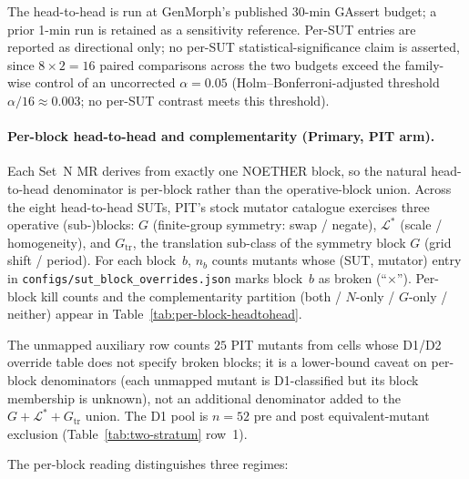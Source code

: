 \documentclass[manuscript]{acmart}
\begin{document}
The head-to-head is run at GenMorph's published 30-min GAssert budget;
a prior 1-min run is retained as a sensitivity reference. Per-SUT
entries are reported as directional only; no per-SUT
statistical-significance claim is asserted, since $8\times 2 = 16$
paired comparisons across the two budgets exceed the family-wise
control of an uncorrected $\alpha = 0.05$ (Holm--Bonferroni-adjusted
threshold $\alpha/16 \approx 0.003$; no per-SUT contrast meets this
threshold).

\paragraph{Per-block head-to-head and complementarity (Primary, PIT arm).}
Each Set~N MR derives from exactly one NOETHER block, so the natural head-to-head denominator is per-block rather than the operative-block union. Across the eight head-to-head SUTs, PIT's stock mutator catalogue exercises three operative (sub-)blocks: $G$ (finite-group symmetry: swap / negate), $\mathcal{L}^{*}$ (scale / homogeneity), and $G_{\mathrm{tr}}$, the translation sub-class of the symmetry block $G$ (grid shift / period). For each block~$b$, $n_{b}$ counts mutants whose (SUT, mutator) entry in \texttt{configs/sut\_block\_overrides.json} marks block~$b$ as broken (``$\times$''). Per-block kill counts and the complementarity partition (both / $N$-only / $G$-only / neither) appear in Table~\ref{tab:per-block-headtohead}.

The unmapped auxiliary row counts $25$ PIT mutants from cells whose D1/D2 override table does not specify broken blocks; it is a lower-bound caveat on per-block denominators (each unmapped mutant is D1-classified but its block membership is unknown), not an additional denominator added to the $G + \mathcal{L}^{*} + G_{\mathrm{tr}}$ union. The D1 pool is $n = 52$ pre and post equivalent-mutant exclusion (Table~\ref{tab:two-stratum} row~1).

The per-block reading distinguishes three regimes:
\end{document}
